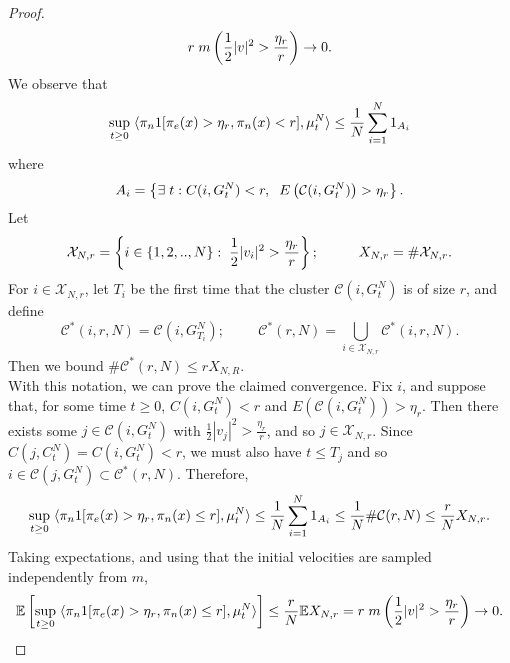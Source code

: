 \begin{proof}
\begin{equation}
    r\hspace{0.1cm}m\left(\frac{1}{2}|v|^2>\frac{\eta_r}{r}\right)\rightarrow 0.
\end{equation}We observe that \begin{equation}
    \sup_{t\geq 0} \hspace{0.1cm} \langle \pi_n 1[\pi_e(x)>\eta_r, \pi_n(x)< r], \mu^N_t\rangle \leq \frac{1}{N}\sum_{i=1}^N 1_{A_i}  
\end{equation} where \begin{equation}
    A_i=\left\{\exists \hspace{0.1cm} t: C(i, G^N_t)< r, \hspace{0.2cm} E\left(\mathcal{C}(i, G^N_t)\right)> \eta_r \right\}.
\end{equation}
Let
\begin{equation}
    \mathcal{X}_{N,r}=\left\{i \in \{1,2,..,N\}: \hspace{0.1cm} \frac{1}{2}|v_i|^2>\frac{\eta_r}{r}\right\}; \hspace{1cm}X_{N,r}=\#\mathcal{X}_{N,r}.
\end{equation} For $i\in \mathcal{X}_{N,r}$, let $T_{i}$ be the first time that the cluster $\mathcal{C}(i, G^N_t)$ is of size $r$, and define \begin{equation}
    \mathcal{C}^*(i,r,N)=\mathcal{C}(i, G^N_{T_i});\hspace{1cm} \mathcal{C}^*(r,N)=\bigcup_{i\in \mathcal{X}_{N,r}} \mathcal{C}^*(i,r,N).
\end{equation} Then we bound $\#\mathcal{C}^*(r,N)\le r X_{N,R}$.  \medskip \\ With this notation, we can prove the claimed convergence. Fix $i$, and suppose that, for some time $t\geq 0$, $C(i, G^N_t)< r$ and $E(\mathcal{C}(i, G^N_t))> \eta_r.$ Then there exists some $j \in \mathcal{C}(i, G^N_t)$ with $\frac{1}{2}|v_j|^2 >\frac{\eta_r}{r}$, and so $j\in \mathcal{X}_{N,r}$. Since $C(j, C^N_t)=C(i, G^N_t)< r$, we must also have $t\le T_j$ and so $i\in\mathcal{C}(j,G^N_t) \subset \mathcal{C}^*(r,N).$ Therefore, \begin{equation}
    \sup_{t\geq 0} \hspace{0.1cm} \langle \pi_n 1[\pi_e(x)>\eta_r, \pi_n(x)\le r], \mu^N_t\rangle \le \frac{1}{N}\sum_{i=1}^N 1_{A_i} \le \frac{1}{N}\#\mathcal{C}(r,N) \le \frac{r}{N}X_{N,r}.
\end{equation}
Taking expectations, and using that the initial velocities are sampled independently from $m$,
\begin{equation} \begin{split}
    \mathbb{E}\left[\sup_{t\geq 0} \hspace{0.1cm} \langle \pi_n 1[\pi_e(x)>\eta_r, \pi_n(x)\le r], \mu^N_t\rangle\right] \le \frac{r}{N} \mathbb{E} X_{N,r}  = r\hspace{0.1cm}m\left(\frac{1}{2}|v|^2>\frac{\eta_r}{r}\right) \rightarrow 0. 
\end{split} \end{equation}
\end{proof}

